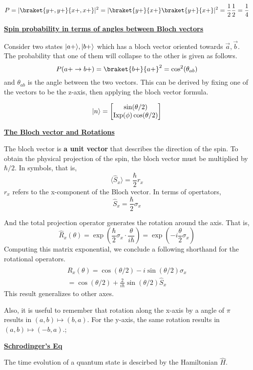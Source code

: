 \documentclass{article}
\DeclarePairedDelimiter\ket{\lvert}{\rangle}
\newcommand{\new}[1]{
    \vspace{2mm}
    \noindent
    \textbf{
    \underline{#1}}
}
\newcommand{\Ixp}{
    {
        \textrm{Ixp}
    }
}
\begin{document}
\[
    P = |\braket{y+,y+}{x+,x+}|^2
    = |\braket{y+}{x+} \braket{y+}{x+}|^2
    = \frac 1 2 \frac 1 2 = \frac 1 4
\]

\new{Spin probability in terms of angles between Bloch vectors}
Consider two states $\ket{a+}, \ket{b+}$ which has a bloch 
vector oriented towards $\vec a, \vec b$. The probability that 
one of them will collapse to the other is given as follows. 
\[
    P(a+ \rightarrow b+) = \braket{b+}{a+}^2 = 
    \cos^2(\theta_{ab})
\]
and $\theta_{ab}$ is the angle between the two vectors. 
This can be derived by fixing one of the vectors to 
be the z-axis, then applying the bloch vector formula. 

\[
    \ket{n} = 
    \begin{bmatrix}
        \sin(\theta / 2)\\
        \Ixp(\phi) \cos(\theta /2)
    \end{bmatrix}
\]

\new{The Bloch vector and Rotations}

The bloch vector is \textbf{a unit vector} that describes 
the direction of the spin. To obtain the physical projection 
of the spin, the bloch vector must be multiplied by $\hbar /2$. 
In symbols, that is, 
\[
    \langle\hat{S}_x\rangle = 
    \frac \hbar 2 r_x
\]
$r_x$ refers to the x-component of the Bloch vector. In terms of 
opertators, 
\[
    \hat{S}_x = \frac \hbar 2 
     \sigma_x
\]

And the total projection operator generates the rotation around 
the axis. That is, 
\[
    \hat{R}_x(\theta) = \exp{\left(
        \frac \hbar 2 \sigma_x
        \cdot
    \frac \theta {i \hbar}\right) }
    = 
    \exp \left(
        -i \frac \theta 2 \sigma_x
    \right)
\]
Computing this matrix exponential, we conclude a following 
shorthand for the rotational operators. 
\begin{equation}
\begin{split}
    \hat{R}_x(\theta) = \cos(\theta/2) - i \sin(\theta/2) \sigma_x 
    \\  = \cos(\theta/2) + \frac 2 {i\hbar} \sin(\theta/2) \hat{S}_x
\end{split}
\end{equation}
This result generalizes to other axes. 

Also, it is useful to remember that rotation along the x-axis 
by a angle of $\pi$ results in $(a, b) \mapsto(b, a)$. For the 
y-axis, the same rotation results in $(a, b) \mapsto (-b, a)$.; 

\new{Schrodinger's Eq}
The time evolution of a quantum state is 
descirbed by the Hamiltonian $\hat H$. 
\end{document}
